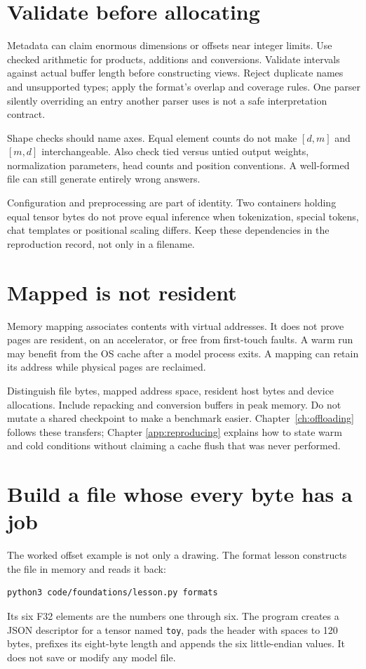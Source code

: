 \section{Validate before allocating}
Metadata can claim enormous dimensions or offsets near integer limits.
Use checked arithmetic for products, additions and conversions. Validate
intervals against actual buffer length before constructing views. Reject
duplicate names and unsupported types; apply the format's overlap and
coverage rules. One parser silently overriding an entry another parser
uses is not a safe interpretation contract.

Shape checks should name axes. Equal element counts do not make
$[d,m]$ and $[m,d]$ interchangeable. Also check tied versus untied output
weights, normalization parameters, head counts and position conventions.
A well-formed file can still generate entirely wrong answers.

Configuration and preprocessing are part of identity. Two containers
holding equal tensor bytes do not prove equal inference when tokenization,
special tokens, chat templates or positional scaling differs. Keep these
dependencies in the reproduction record, not only in a filename.

\section{Mapped is not resident}
Memory mapping associates contents with virtual addresses. It does not
prove pages are resident, on an accelerator, or free from first-touch
faults. A warm run may benefit from the OS cache after a model process
exits. A mapping can retain its address while physical pages are reclaimed.

Distinguish file bytes, mapped address space, resident host bytes and device
allocations. Include repacking and conversion buffers in peak memory.
Do not mutate a shared checkpoint to make a benchmark easier.
Chapter~\ref{ch:offloading} follows these transfers; Chapter
\ref{app:reproducing} explains how to state warm and cold conditions
without claiming a cache flush that was never performed.

\section{Build a file whose every byte has a job}
The worked offset example is not only a drawing. The format lesson constructs
the file in memory and reads it back:
\begin{verbatim}
python3 code/foundations/lesson.py formats
\end{verbatim}
Its six F32 elements are the numbers one through six. The program creates
a JSON descriptor for a tensor named \texttt{toy}, pads the header with
spaces to 120 bytes, prefixes its eight-byte length and appends the six
little-endian values. It does not save or modify any model file.


